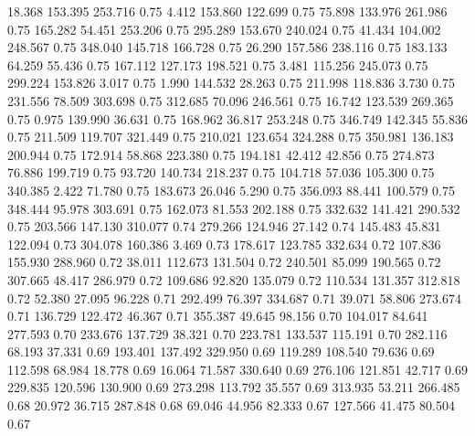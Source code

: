   18.368  153.395  253.716         0.75
   4.412  153.860  122.699         0.75
  75.898  133.976  261.986         0.75
 165.282   54.451  253.206         0.75
 295.289  153.670  240.024         0.75
  41.434  104.002  248.567         0.75
 348.040  145.718  166.728         0.75
  26.290  157.586  238.116         0.75
 183.133   64.259   55.436         0.75
 167.112  127.173  198.521         0.75
   3.481  115.256  245.073         0.75
 299.224  153.826    3.017         0.75
   1.990  144.532   28.263         0.75
 211.998  118.836    3.730         0.75
 231.556   78.509  303.698         0.75
 312.685   70.096  246.561         0.75
  16.742  123.539  269.365         0.75
   0.975  139.990   36.631         0.75
 168.962   36.817  253.248         0.75
 346.749  142.345   55.836         0.75
 211.509  119.707  321.449         0.75
 210.021  123.654  324.288         0.75
 350.981  136.183  200.944         0.75
 172.914   58.868  223.380         0.75
 194.181   42.412   42.856         0.75
 274.873   76.886  199.719         0.75
  93.720  140.734  218.237         0.75
 104.718   57.036  105.300         0.75
 340.385    2.422   71.780         0.75
 183.673   26.046    5.290         0.75
 356.093   88.441  100.579         0.75
 348.444   95.978  303.691         0.75
 162.073   81.553  202.188         0.75
 332.632  141.421  290.532         0.75
 203.566  147.130  310.077         0.74
 279.266  124.946   27.142         0.74
 145.483   45.831  122.094         0.73
 304.078  160.386    3.469         0.73
 178.617  123.785  332.634         0.72
 107.836  155.930  288.960         0.72
  38.011  112.673  131.504         0.72
 240.501   85.099  190.565         0.72
 307.665   48.417  286.979         0.72
 109.686   92.820  135.079         0.72
 110.534  131.357  312.818         0.72
  52.380   27.095   96.228         0.71
 292.499   76.397  334.687         0.71
  39.071   58.806  273.674         0.71
 136.729  122.472   46.367         0.71
 355.387   49.645   98.156         0.70
 104.017   84.641  277.593         0.70
 233.676  137.729   38.321         0.70
 223.781  133.537  115.191         0.70
 282.116   68.193   37.331         0.69
 193.401  137.492  329.950         0.69
 119.289  108.540   79.636         0.69
 112.598   68.984   18.778         0.69
  16.064   71.587  330.640         0.69
 276.106  121.851   42.717         0.69
 229.835  120.596  130.900         0.69
 273.298  113.792   35.557         0.69
 313.935   53.211  266.485         0.68
  20.972   36.715  287.848         0.68
  69.046   44.956   82.333         0.67
 127.566   41.475   80.504         0.67
